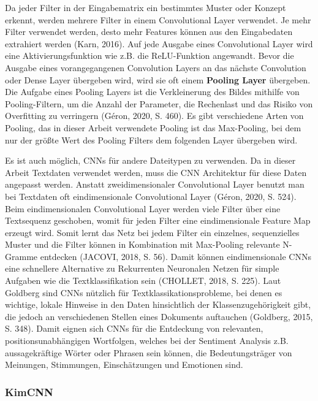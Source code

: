 \documentclass[11pt]{article}
\begin{document}
Da jeder Filter in der Eingabematrix ein bestimmtes Muster oder Konzept
erkennt, werden mehrere Filter in einem Convolutional Layer verwendet.
Je mehr Filter verwendet werden, desto mehr Features können aus den
Eingabedaten extrahiert werden (Karn, 2016). Auf jede Ausgabe eines
Convolutional Layer wird eine Aktivierungsfunktion wie z.B. die
ReLU-Funktion angewandt. Bevor die Ausgabe eines vorangegangenen
Convolution Layers an das nächste Convolution oder Dense Layer übergeben
wird, wird sie oft einem \textbf{Pooling Layer} übergeben. Die Aufgabe
eines Pooling Layers ist die Verkleinerung des Bildes mithilfe von
Pooling-Filtern, um die Anzahl der Parameter, die Rechenlast und das
Risiko von Overfitting zu verringern (Géron, 2020, S. 460). Es gibt
verschiedene Arten von Pooling, das in dieser Arbeit verwendete Pooling
ist das Max-Pooling, bei dem nur der größte Wert des Pooling Filters dem
folgenden Layer übergeben wird.

Es ist auch möglich, CNNs für andere Dateitypen zu verwenden. Da in
dieser Arbeit Textdaten verwendet werden, muss die CNN Architektur für
diese Daten angepasst werden. Anstatt zweidimensionaler Convolutional
Layer benutzt man bei Textdaten oft eindimensionale Convolutional Layer
(Géron, 2020, S. 524). Beim eindimensionalen Convolutional Layer werden
viele Filter über eine Textsequenz geschoben, womit für jeden Filter
eine eindimensionale Feature Map erzeugt wird. Somit lernt das Netz bei
jedem Filter ein einzelnes, sequenzielles Muster und die Filter können
in Kombination mit Max-Pooling relevante N-Gramme entdecken (JACOVI,
2018, S. 56). Damit können eindimensionale CNNs eine schnellere
Alternative zu Rekurrenten Neuronalen Netzen für simple Aufgaben wie die
Textklassifikation sein (CHOLLET, 2018, S. 225). Laut Goldberg sind CNNs
nützlich für Textklassikationsprobleme, bei denen es wichtige, lokale
Hinweise in den Daten hinsichtlich der Klassenzugehörigkeit gibt, die
jedoch an verschiedenen Stellen eines Dokuments auftauchen (Goldberg,
2015, S. 348). Damit eignen sich CNNs für die Entdeckung von relevanten,
positionsunabhängigen Wortfolgen, welches bei der Sentiment Analysis
z.B. aussagekräftige Wörter oder Phrasen sein können, die
Bedeutungsträger von Meinungen, Stimmungen, Einschätzungen und Emotionen
sind.

    \hypertarget{kimcnn}{%
\subsubsection{KimCNN}\label{kimcnn}}
\end{document}
